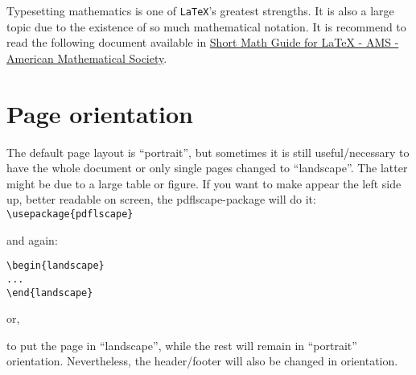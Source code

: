 Typesetting mathematics is one of \texttt{LaTeX}'s greatest strengths. It is also a large topic due to the existence of so much mathematical notation. It is recommend to read the following document available in \href{http://www.google.pt/url?sa=t&rct=j&q=&esrc=s&source=web&cd=1&cad=rja&ved=0CB4QFjAA&url=ftp%3A%2F%2Fftp.ams.org%2Fpub%2Ftex%2Fdoc%2Famsmath%2Fshort-math-guide.pdf&ei=DkScUOm8IJC5hAei7oGQDg&usg=AFQjCNEHl1pXuurNmXAdqfC0z-pPAbDyUw}{Short Math Guide for LaTeX - AMS - American Mathematical Society}.

\section{Page orientation}

\begin{sloppypar}
The default page layout is ``portrait'', but sometimes it is still useful/necessary to have the whole document or only single pages changed to ``landscape''. The latter might be due to a large table or figure. If you want to make appear the left side up, better readable on screen, the pdflscape-package will do it:
\verb!\usepackage{pdflscape}!
\end{sloppypar}
and again:
\begin{verbatim}
\begin{landscape}
...
\end{landscape}
\end{verbatim}

or, 
\verb!!

to put the page in ``landscape'', while the rest will remain in ``portrait'' orientation. Nevertheless, the header/footer will also be changed in orientation.


